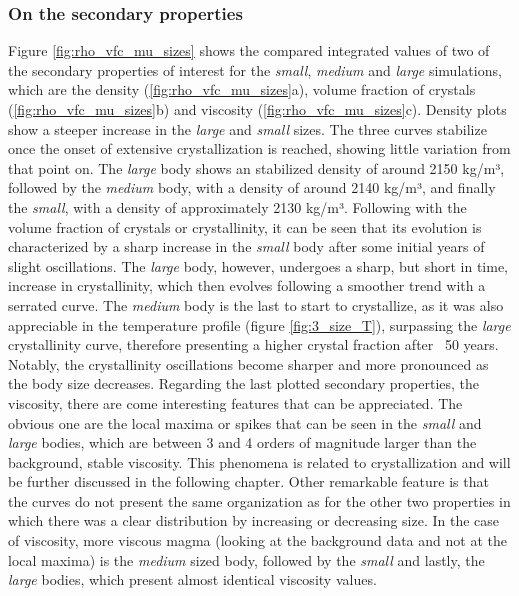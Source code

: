 \subsubsection{On the secondary properties}
Figure \ref{fig:rho_vfc_mu_sizes} shows the compared integrated values of two of the secondary properties of interest for the \textit{small}, \textit{medium} and \textit{large} simulations, which are the density (\ref{fig:rho_vfc_mu_sizes}a), volume fraction of crystals (\ref{fig:rho_vfc_mu_sizes}b) and viscosity (\ref{fig:rho_vfc_mu_sizes}c). Density plots show a steeper increase in the \textit{large} and \textit{small} sizes. The three curves stabilize once the onset of extensive crystallization is reached, showing little variation from that point on. The \textit{large} body shows an stabilized density of around 2150 kg/m³, followed by the \textit{medium} body, with a density of around 2140 kg/m³, and finally the \textit{small}, with a density of approximately 2130 kg/m³. Following with the volume fraction of crystals or crystallinity, it can be seen that its evolution is characterized by a sharp increase in the \textit{small} body after some initial years of slight oscillations. The \textit{large} body, however, undergoes a sharp, but short in time, increase in crystallinity, which then evolves following a smoother trend with a serrated curve. The \textit{medium} body is the last to start to crystallize, as it was also appreciable in the temperature profile (figure \ref{fig:3_size_T}), surpassing the \textit{large} crystallinity curve, therefore presenting a higher crystal fraction after ~50 years. Notably, the crystallinity oscillations become sharper and more pronounced as the body size decreases. Regarding the last plotted secondary properties, the viscosity, there are come interesting features that can be appreciated. The obvious one are the local maxima or spikes that can be seen in the \textit{small} and \textit{large} bodies, which are between 3 and 4 orders of magnitude larger than the background, stable viscosity. This phenomena is related to crystallization and will be further discussed in the following chapter. Other remarkable feature is that the curves do not present the same organization as for the other two properties in which there was a clear distribution by increasing or decreasing size. In the case of viscosity, more viscous magma (looking at the background data and not at the local maxima) is the \textit{medium} sized body, followed by the \textit{small} and lastly, the \textit{large} bodies, which present almost identical viscosity values. 

